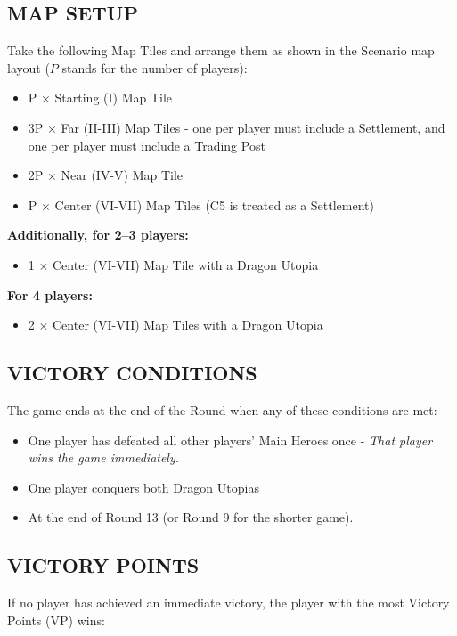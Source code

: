 \begin{multicols*}{2}
\subsection*{\MakeUppercase{Map Setup}}
Take the following Map Tiles and arrange them as shown in the Scenario map layout ($P$ stands for the number of players):

\begin{itemize}
  \item P × Starting (I) Map Tile
  \item 3P × Far (II-III) Map Tiles - one per player must include a Settlement, and one per player must include a Trading Post
  \item 2P × Near (IV-V) Map Tile
  \item P × Center (VI-VII) Map Tiles (C5 is treated as a Settlement)
\end{itemize}

\textbf{Additionally, for 2--3 players:}
\begin{itemize}
  \item 1 × Center (VI-VII) Map Tile with a Dragon Utopia
\end{itemize}

\textbf{For 4 players:}
\begin{itemize}
  \item 2 × Center (VI-VII) Map Tiles with a Dragon Utopia
\end{itemize}

\subsection*{\MakeUppercase{Victory Conditions}}
The game ends at the end of the Round when any of these conditions are met:

\begin{itemize}
 \item One player has defeated all other players' Main Heroes once - \textit{That player wins the game immediately.}
 \item One player conquers both Dragon Utopias %
 \item At the end of Round 13 (or Round 9 for the shorter game).
\end{itemize}

\subsection*{\MakeUppercase{Victory Points}}
If no player has achieved an immediate victory, the player with the most Victory Points (VP) wins:


\end{multicols*}

